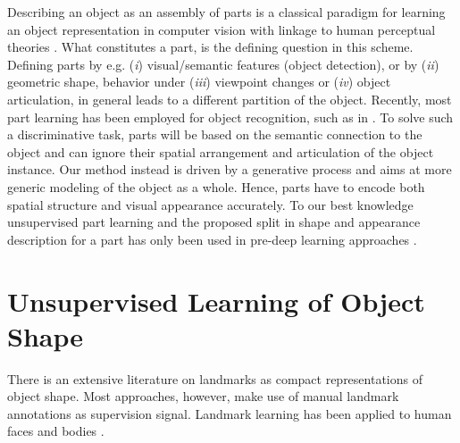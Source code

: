 	Describing an object as an assembly of parts is a classical paradigm for learning an object representation in computer vision \cite{ross06parts} with linkage to human perceptual theories \cite{biederman87recognition}.
	What constitutes a part, is the defining question in this scheme.
	Defining parts by e.g. (\emph{i}) visual/semantic features (object detection), or by (\emph{ii}) geometric shape, behavior under (\emph{iii}) viewpoint changes or (\emph{iv}) object articulation, in general leads to a different partition of the object.
	Recently, most part learning has been employed for object recognition, such as in \cite{felzenszwalb10dpm, novotny17anchornet, singh12patch, mesnil13partssemantic, yang16dpmpose, lam17finerecognize}.
	To solve such a discriminative task, parts will be based on the semantic connection to the object and can ignore their spatial arrangement and articulation of the object instance. Our method instead is driven by a generative process and aims at more generic modeling of the object as a whole. Hence, parts have to encode both spatial structure and visual appearance accurately. To our best knowledge unsupervised part learning and the proposed split in shape and appearance description for a part has only been used in pre-deep learning approaches \cite{ross06parts, nguyen13nonnegative, cootes98activeappear}.


\section{Unsupervised Learning of Object Shape}

	There is an extensive literature on landmarks as compact representations of object shape.
	Most approaches, however, make use of manual landmark annotations as supervision signal. Landmark learning has been applied to human faces \cite{wu17faceocclu, ranjan16hyperface, yu16deform, zhang16facealign, zhu15facecoarse, zhang14facemultitask, pedersoli14facedeform} and bodies \cite{ionescu11posestructured, toshev14deeppose, pfister15flowingconv, wei16posemachine, newell16hourglass, lim18posetransform, cao17affinityfield}.

